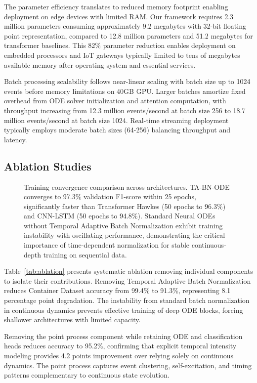 \documentclass[10pt,journal,compsoc]{IEEEtran}
\begin{document}
The parameter efficiency translates to reduced memory footprint enabling deployment on edge devices with limited RAM. Our framework requires 2.3 million parameters consuming approximately 9.2 megabytes with 32-bit floating point representation, compared to 12.8 million parameters and 51.2 megabytes for transformer baselines. This 82\% parameter reduction enables deployment on embedded processors and IoT gateways typically limited to tens of megabytes available memory after operating system and essential services.

Batch processing scalability follows near-linear scaling with batch size up to 1024 events before memory limitations on 40GB GPU. Larger batches amortize fixed overhead from ODE solver initialization and attention computation, with throughput increasing from 12.3 million events/second at batch size 256 to 18.7 million events/second at batch size 1024. Real-time streaming deployment typically employs moderate batch sizes (64-256) balancing throughput and latency.

\subsection{Ablation Studies}

\begin{figure}[!t]
\centering

\caption{Training convergence comparison across architectures. TA-BN-ODE converges to 97.3\% validation F1-score within 25 epochs, significantly faster than Transformer Hawkes (50 epochs to 96.3\%) and CNN-LSTM (50 epochs to 94.8\%). Standard Neural ODEs without Temporal Adaptive Batch Normalization exhibit training instability with oscillating performance, demonstrating the critical importance of time-dependent normalization for stable continuous-depth training on sequential data.}
\label{fig:convergence}
\end{figure}

Table~\ref{tab:ablation} presents systematic ablation removing individual components to isolate their contributions. Removing Temporal Adaptive Batch Normalization reduces Container Dataset accuracy from 99.4\% to 91.3\%, representing 8.1 percentage point degradation. The instability from standard batch normalization in continuous dynamics prevents effective training of deep ODE blocks, forcing shallower architectures with limited capacity.

Removing the point process component while retaining ODE and classification heads reduces accuracy to 95.2\%, confirming that explicit temporal intensity modeling provides 4.2 points improvement over relying solely on continuous dynamics. The point process captures event clustering, self-excitation, and timing patterns complementary to continuous state evolution.
\end{document}
